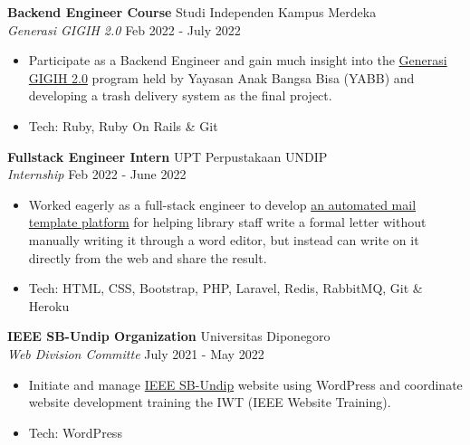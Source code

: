 \documentclass[a4paper]{article}
\begin{document}
\textbf{Backend Engineer Course} \hfill Studi Independen Kampus Merdeka \\
\textit{Generasi GIGIH 2.0} \hfill Feb 2022 - July 2022\\
\vspace{-1mm}
\begin{itemize} \itemsep 1pt
	\item Participate as a Backend Engineer and gain much insight into the \href{https://www.anakbangsabisa.org/generasi-gigih/}{Generasi GIGIH 2.0} program held by Yayasan Anak Bangsa Bisa (YABB) and developing a trash delivery system as the final project.
	\item Tech: Ruby, Ruby On Rails \& Git
\end{itemize}

\textbf{Fullstack Engineer Intern} \hfill UPT Perpustakaan UNDIP \\
\textit{Internship} \hfill Feb 2022 - June 2022\\
\vspace{-1mm}
\begin{itemize} \itemsep 1pt
	\item Worked eagerly as a full-stack engineer to develop \href{http://template-surat-testing.herokuapp.com/}{an automated mail template platform} for helping library staff write a formal letter without manually writing it through a word editor, but instead can write on it directly from the web and share the result.
	\item Tech: HTML, CSS, Bootstrap, PHP, Laravel, Redis, RabbitMQ, Git \& Heroku
\end{itemize}

\textbf{IEEE SB-Undip Organization} \hfill Universitas Diponegoro\\
\textit{Web Division Committe} \hfill July 2021 - May 2022\\
\vspace{-1mm}
\begin{itemize} \itemsep 1pt
	\item Initiate and manage \href{https://edu.ieee.org/id-undip/}{IEEE SB-Undip} website using WordPress and coordinate website development training the IWT (IEEE Website Training).
	\item Tech: WordPress
\end{itemize}
\end{document}
